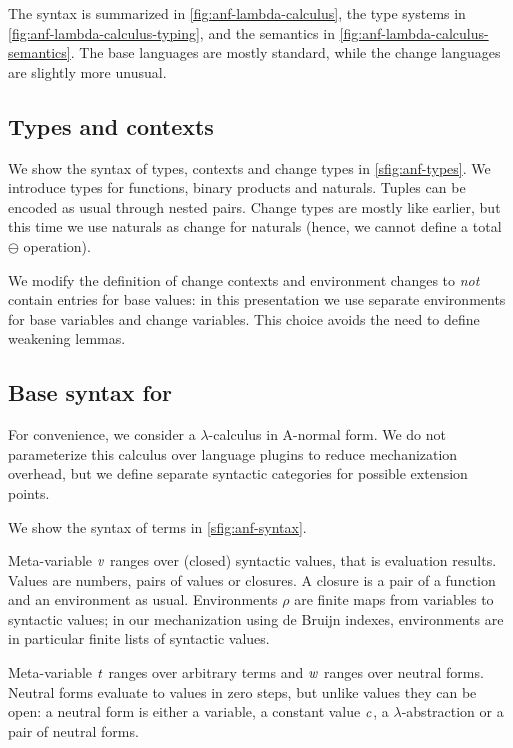 The syntax is summarized in \cref{fig:anf-lambda-calculus}, the
type systems in \cref{fig:anf-lambda-calculus-typing}, and the
semantics in \cref{fig:anf-lambda-calculus-semantics}. The base
languages are mostly standard, while the change languages are slightly more
unusual.



\subsection{Types and contexts}
\label{sec:bsos-anf-types}
%
We show the syntax of types, contexts and change types in
\cref{sfig:anf-types}.
We introduce types for functions, binary products and naturals.
Tuples can be encoded as usual through nested pairs.
Change types are mostly like earlier, but this time we use
naturals as change for naturals (hence, we cannot define a total
\ensuremath{\ominus } operation).

We modify the definition of change contexts and environment
changes to \emph{not} contain entries for base values: in this
presentation we use separate environments for base variables and
change variables. This choice avoids the need to define weakening
lemmas.

\subsection{Base syntax for \ilcUntau}
\label{sec:bsos-anf-syntax}
For convenience, we consider a $\lambda$-calculus in
A-normal form. We do not parameterize this calculus over language
plugins to reduce mechanization overhead, but we define separate syntactic
categories for possible extension points.

We show the syntax of terms in \cref{sfig:anf-syntax}.

Meta-variable \ensuremath{\Varid{v}} ranges over (closed) syntactic values, that is
evaluation results. Values are numbers, pairs of values or
closures. A closure is a pair of a function and an environment as
usual.
Environments \ensuremath{\rho} are finite maps from variables to syntactic
values; in our mechanization using de Bruijn indexes,
environments are in particular finite lists of syntactic values.

Meta-variable \ensuremath{\Varid{t}} ranges over arbitrary terms and \ensuremath{\Varid{w}}
ranges over neutral forms. Neutral forms evaluate to values in
zero steps, but unlike values they can be open: a neutral form is
either a variable, a constant value \ensuremath{\Varid{c}}, a $\lambda$-abstraction or a
pair of neutral forms.

